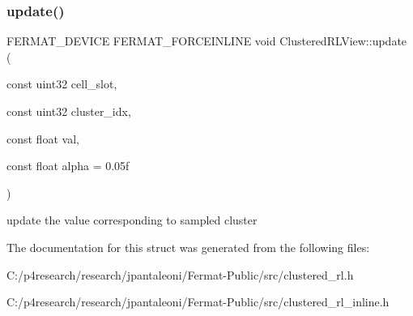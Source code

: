 \subsubsection{\texorpdfstring{update()}{update()}}
{\footnotesize\ttfamily F\+E\+R\+M\+A\+T\+\_\+\+D\+E\+V\+I\+CE F\+E\+R\+M\+A\+T\+\_\+\+F\+O\+R\+C\+E\+I\+N\+L\+I\+NE void Clustered\+R\+L\+View\+::update (\begin{DoxyParamCaption}\item[{const uint32}]{cell\+\_\+slot,  }\item[{const uint32}]{cluster\+\_\+idx,  }\item[{const float}]{val,  }\item[{const float}]{alpha = {\ttfamily 0.05f} }\end{DoxyParamCaption})}

update the value corresponding to sampled cluster 

The documentation for this struct was generated from the following files\+:\begin{DoxyCompactItemize}
\item 
C\+:/p4research/research/jpantaleoni/\+Fermat-\/\+Public/src/clustered\+\_\+rl.\+h\item 
C\+:/p4research/research/jpantaleoni/\+Fermat-\/\+Public/src/clustered\+\_\+rl\+\_\+inline.\+h\end{DoxyCompactItemize}
